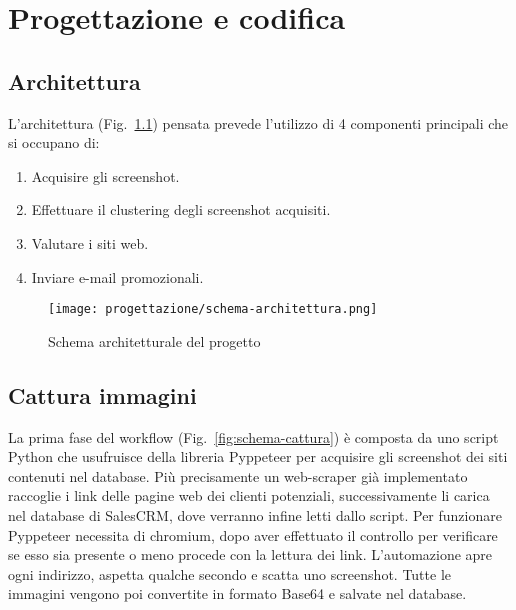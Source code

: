 \chapter{Progettazione e codifica}

\label{cap:progettazione}


\section{Architettura}
L'architettura (Fig.~\ref{fig:schema-architettura}) pensata prevede l'utilizzo di 4 componenti principali che si occupano di:
\begin{enumerate}
    \item Acquisire gli screenshot.
    \item Effettuare il clustering degli screenshot acquisiti.
    \item Valutare i siti web.
    \item Inviare e-mail promozionali.
\end{enumerate}

\begin{figure}[!h] 
    \centering 
    \texttt{[image: progettazione/schema-architettura.png]} 
    \caption{Schema architetturale del progetto}
    \label{fig:schema-architettura}
  \end{figure}


\newpage

\section{Cattura immagini}
La prima fase del workflow (Fig.~\ref{fig:schema-cattura}) è composta da uno script Python che usufruisce della libreria Pyppeteer per acquisire gli screenshot dei siti contenuti nel database.
Più precisamente un web-scraper già implementato raccoglie i link delle pagine web dei clienti potenziali, successivamente li carica nel database di SalesCRM, dove verranno infine letti dallo script.
Per funzionare Pyppeteer necessita di chromium, dopo aver effettuato il controllo per verificare se esso sia presente o meno procede con la lettura dei link. 
L'automazione apre ogni indirizzo, aspetta qualche secondo e scatta uno screenshot. 
Tutte le immagini vengono poi convertite in formato Base64 e salvate nel database.

